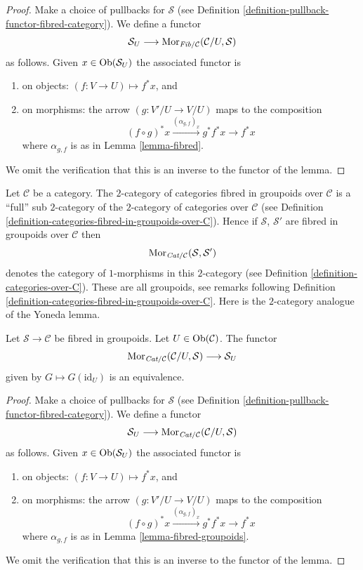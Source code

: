\begin{proof}
Make a choice of pullbacks for $\mathcal{S}$
(see Definition \ref{definition-pullback-functor-fibred-category}).
We define a functor
$$
\mathcal{S}_U
\longrightarrow
\mathop{\mathrm{Mor}}\nolimits_{\textit{Fib}/\mathcal{C}}(\mathcal{C}/U, \mathcal{S})
$$
as follows. Given
$x \in \mathop{\mathrm{Ob}}\nolimits(\mathcal{S}_U)$
the associated functor is
\begin{enumerate}
\item on objects: $(f : V \to U) \mapsto f^*x$, and
\item on morphisms: the arrow $(g : V'/U \to V/U)$ maps to
the composition
$$
(f \circ g)^*x \xrightarrow{(\alpha_{g, f})_x} g^*f^*x \rightarrow f^*x
$$
where $\alpha_{g, f}$ is as in Lemma \ref{lemma-fibred}.
\end{enumerate}
We omit the verification that this is an inverse to the functor
of the lemma.
\end{proof}

\noindent
Let $\mathcal{C}$ be a category. The $2$-category of categories
fibred in groupoids over $\mathcal{C}$ is a
``full'' sub $2$-category of the $2$-category of categories over
$\mathcal{C}$ (see
Definition \ref{definition-categories-fibred-in-groupoids-over-C}).
Hence if $\mathcal{S}$, $\mathcal{S}'$ are fibred in groupoids
over $\mathcal{C}$ then
$$
\mathop{\mathrm{Mor}}\nolimits_{\textit{Cat}/\mathcal{C}}(\mathcal{S}, \mathcal{S}')
$$
denotes the category of $1$-morphisms in this $2$-category
(see Definition \ref{definition-categories-over-C}).
These are all groupoids, see remarks following
Definition \ref{definition-categories-fibred-in-groupoids-over-C}.
Here is the $2$-category analogue of the Yoneda lemma.

\begin{lemma}
\label{lemma-yoneda-2category}
Let $\mathcal{S}\to \mathcal{C}$ be fibred in groupoids.
Let $U \in \mathop{\mathrm{Ob}}\nolimits(\mathcal{C})$.
The functor
$$
\mathop{\mathrm{Mor}}\nolimits_{\textit{Cat}/\mathcal{C}}(\mathcal{C}/U, \mathcal{S})
\longrightarrow
\mathcal{S}_U
$$
given by $G \mapsto G(\text{id}_U)$ is an equivalence.
\end{lemma}

\begin{proof}
Make a choice of pullbacks for $\mathcal{S}$
(see Definition \ref{definition-pullback-functor-fibred-category}).
We define a functor
$$
\mathcal{S}_U
\longrightarrow
\mathop{\mathrm{Mor}}\nolimits_{\textit{Cat}/\mathcal{C}}(\mathcal{C}/U, \mathcal{S})
$$
as follows. Given
$x \in \mathop{\mathrm{Ob}}\nolimits(\mathcal{S}_U)$
the associated functor is
\begin{enumerate}
\item on objects: $(f : V \to U) \mapsto f^*x$, and
\item on morphisms: the arrow $(g : V'/U \to V/U)$ maps to
the composition
$$
(f \circ g)^*x \xrightarrow{(\alpha_{g, f})_x} g^*f^*x \rightarrow f^*x
$$
where $\alpha_{g, f}$ is as in Lemma \ref{lemma-fibred-groupoids}.
\end{enumerate}
We omit the verification that this is an inverse to the functor
of the lemma.
\end{proof}


